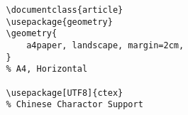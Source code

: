 \documentclass{article}
\begin{document}
\pagestyle{empty}

\setlength{\columnsep}{30pt}
\begin{multicols}{2}

    \begin{minipage}{0.45\textwidth}
        \raggedright
        \begin{tcolorbox}[colback=orange!30, colframe=orange!60, title=Document]
            \begin{verbatim}
                \documentclass{article} 
                \usepackage{geometry} 
                \geometry{
                    a4paper, landscape, margin=2cm,
                }
                % A4, Horizontal          

                \usepackage[UTF8]{ctex}
                % Chinese Charactor Support


\end{verbatim}
\end{tcolorbox}
\end{minipage}
\end{multicols}
\end{document}

